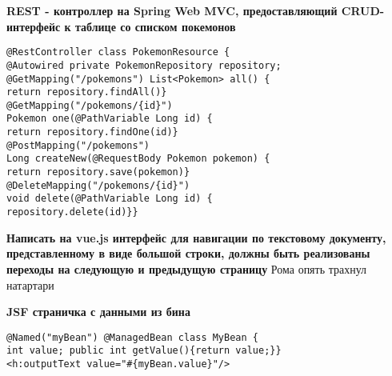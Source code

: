 \documentclass{article}
\begin{document}
\begin{minipage}[t]{0.3\textwidth}
    \textbf{REST - контроллер на Spring Web MVC, предоставляющий CRUD-интерфейс к таблице со списком покемонов}
    \begin{lstlisting}[frame=single, basicstyle=\tiny\ttfamily, breaklines=true, breakatwhitespace=true, postbreak=\mbox{\textcolor{red}{$\hookrightarrow$}\space}]
@RestController class PokemonResource {
@Autowired private PokemonRepository repository;
@GetMapping("/pokemons") List<Pokemon> all() {
return repository.findAll()}
@GetMapping("/pokemons/{id}")
Pokemon one(@PathVariable Long id) {
return repository.findOne(id)}
@PostMapping("/pokemons")
Long createNew(@RequestBody Pokemon pokemon) {
return repository.save(pokemon)}
@DeleteMapping("/pokemons/{id}")
void delete(@PathVariable Long id) {
repository.delete(id)}}
    \end{lstlisting}
\end{minipage}%
\hfill
\begin{minipage}[t]{0.3\textwidth}
    \textbf{Написать на vue.js интерфейс для навигации по текстовому документу, представленному в виде большой строки, должны быть реализованы переходы на следующую и предыдущую страницу}
Рома опять трахнул натартари
\end{minipage}%
\hfill
\begin{minipage}[t]{0.3\textwidth}
    \textbf{JSF страничка с данными из бина}
    \begin{lstlisting}[frame=single, basicstyle=\tiny\ttfamily, breaklines=true, breakatwhitespace=true, postbreak=\mbox{\textcolor{red}{$\hookrightarrow$}\space}]
@Named("myBean") @ManagedBean class MyBean {
int value; public int getValue(){return value;}}
<h:outputText value="#{myBean.value}"/>        
    \end{lstlisting}
\end{minipage}%
\\
\end{document}
